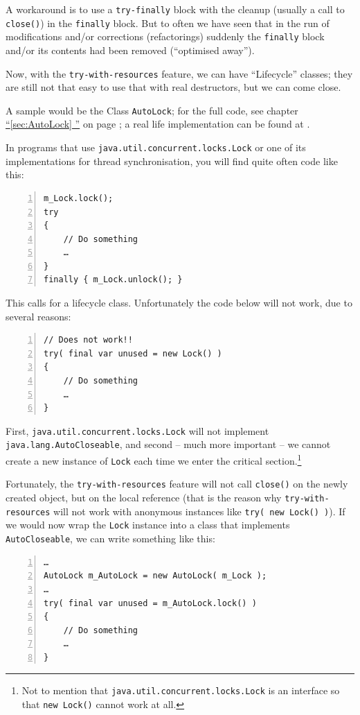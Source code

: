 \documentclass[11pt,a4paper, titlepage, parskip=half, headsepline, footsepline, cleardoublepage=current, headheight=1cm]{scrbook}
\newcommand*{\tqfullvref}[1]{\hyperref[{#1}]{“\ref*{#1} \nameref*{#1}”} on page \pageref{#1}}
\begin{document}
A workaround is to use a \lstinline|try-finally| block with the cleanup (usually a call to \lstinline|close()|) in the \lstinline|finally| block. But to often we have seen that in the run of modifications and/or corrections (refactorings) suddenly the \lstinline|finally| block and/or its contents had been removed (“optimised away”).

Now, with the \lstinline|try-with-resources| feature, we can have “Lifecycle” classes; they are still not that easy to use that with real destructors, but we can come close.

A sample would be the Class \lstinline|AutoLock|; for the full code, see chapter \tqfullvref{sec:AutoLock}; a real life implementation can be found at \autocite{TQUADRAT_ORG_FOUNDATION_AUTOLOCK}.

In programs that use \lstinline|java.util.concurrent.locks.Lock| or one of its implementations for thread synchronisation, you will find quite often code like this:
\begin{lstlisting}[numbers=left]
m_Lock.lock();
try
{
    // Do something
    …
}
finally { m_Lock.unlock(); }
\end{lstlisting}

This calls for a lifecycle class. Unfortunately the code below will not work, due to several reasons:
\begin{lstlisting}[numbers=left]
// Does not work!!
try( final var unused = new Lock() )
{
    // Do something
    …
}
\end{lstlisting}

First, \lstinline|java.util.concurrent.locks.Lock| will not implement \lstinline|java.lang.AutoCloseable|, and second – much more important – we cannot create a new instance of \lstinline|Lock| each time we enter the critical section.\footnote{Not to mention that \lstinline|java.util.concurrent.locks.Lock| is an interface so that \lstinline|new Lock()| cannot work at all.}

Fortunately, the \lstinline|try-with-resources| feature will not call \lstinline|close()| on the newly created object, but on the local reference (that is the reason why \lstinline|try-with-resources| will not work with anonymous instances like \lstinline|try( new Lock() )|). If we would now wrap the \lstinline|Lock| instance into a class that implements \lstinline|AutoCloseable|, we can write something like this:
\begin{lstlisting}[numbers=left]
…
AutoLock m_AutoLock = new AutoLock( m_Lock );
…
try( final var unused = m_AutoLock.lock() )
{
    // Do something
    …
}
\end{lstlisting}
\end{document}
